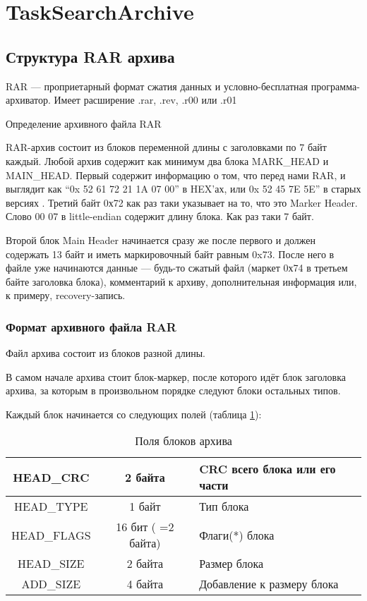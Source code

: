 \section{TaskSearchArchive}

\subsection{Структура RAR архива}
RAR — проприетарный формат сжатия данных и условно-бесплатная программа-архиватор. Имеет расширение .rar, .rev, .r00 или .r01

Определение архивного файла RAR

RAR-архив состоит из блоков переменной длины с заголовками по 7 байт каждый. Любой архив содержит как минимум два блока MARK\_HEAD и MAIN\_HEAD. Первый содержит информацию о том, что перед нами RAR, и выглядит как ``0x 52 61 72 21 1A 07 00'' в HEX'ах, или 0x 52 45 7E 5E” в старых версиях . Третий байт 0х72 как раз таки указывает на то, что это Marker Header. Слово 00 07 в little-endian содержит длину блока. Как раз таки 7 байт.\cite{rar}

Второй блок Main Header начинается сразу же после первого и должен содержать 13 байт и иметь маркировочный байт равным 0x73. После него в файле уже начинаются данные — будь-то сжатый файл (маркет 0х74 в третьем байте заголовка блока), комментарий к архиву, дополнительная информация или, к примеру, recovery-запись.\cite{wikirar}

\subsubsection{Формат архивного файла RAR}
                
Файл архива состоит из блоков разной длины.

В самом начале архива стоит блок-маркер, после которого идёт блок заголовка архива, за которым в произвольном порядке следуют блоки остальных типов.
                
Каждый блок начинается со следующих полей (таблица \ref{tab:blok}):         

\begin{table}[h]
 \caption{Поля блоков архива}
 \label{tab:blok}
 \begin{tabularx}{\textwidth}{|c|c|X|}
\hline
HEAD\_CRC & 2 байта & CRC всего блока или его части\\
\hline
HEAD\_TYPE & 1 байт & Тип блока \\
\hline
HEAD\_FLAGS & 16 бит ( =2 байта)& Флаги(*) блока\\
\hline
HEAD\_SIZE & 2 байта & Размер блока \\
\hline
ADD\_SIZE & 4 байта & Добавление к размеру блока\\
\hline
\end{tabularx}
\end{table}
            

